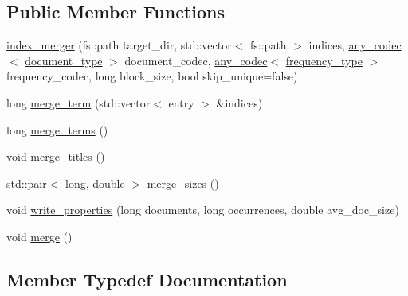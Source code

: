 \subsection*{Public Member Functions}
\begin{DoxyCompactItemize}
\item 
\mbox{\hyperlink{classirk_1_1index__merger_abd636b1ba913662b7b917c505715696e}{index\+\_\+merger}} (fs\+::path target\+\_\+dir, std\+::vector$<$ fs\+::path $>$ indices, \mbox{\hyperlink{namespaceirk_a831a3a869cf19601dbfb5c41765a2e87}{any\+\_\+codec}}$<$ \mbox{\hyperlink{classirk_1_1index__merger_ace9b689f5d38f6aeed3ce16f0f1bd260}{document\+\_\+type}} $>$ document\+\_\+codec, \mbox{\hyperlink{namespaceirk_a831a3a869cf19601dbfb5c41765a2e87}{any\+\_\+codec}}$<$ \mbox{\hyperlink{classirk_1_1index__merger_a6cb409ab2e737118969206ee9b27d147}{frequency\+\_\+type}} $>$ frequency\+\_\+codec, long block\+\_\+size, bool skip\+\_\+unique=false)
\item 
long \mbox{\hyperlink{classirk_1_1index__merger_a83813154e14e7f558e93b657695de11a}{merge\+\_\+term}} (std\+::vector$<$ entry $>$ \&indices)
\item 
long \mbox{\hyperlink{classirk_1_1index__merger_a7ad47aefaad1a6f1d04ba904a672c0e5}{merge\+\_\+terms}} ()
\item 
void \mbox{\hyperlink{classirk_1_1index__merger_a82a8c5def4100f2cd1be63a037a3a570}{merge\+\_\+titles}} ()
\item 
std\+::pair$<$ long, double $>$ \mbox{\hyperlink{classirk_1_1index__merger_a215f38c50ba34e627ae54ec4f5caf52a}{merge\+\_\+sizes}} ()
\item 
void \mbox{\hyperlink{classirk_1_1index__merger_a22098d0868dcb779ce43540a60b724ab}{write\+\_\+properties}} (long documents, long occurrences, double avg\+\_\+doc\+\_\+size)
\item 
void \mbox{\hyperlink{classirk_1_1index__merger_a500ccb6d5fb8106183dc94abf6d64a5f}{merge}} ()
\end{DoxyCompactItemize}


\subsection{Member Typedef Documentation}
\mbox{\label{classirk_1_1index__merger_ace9b689f5d38f6aeed3ce16f0f1bd260}} 
